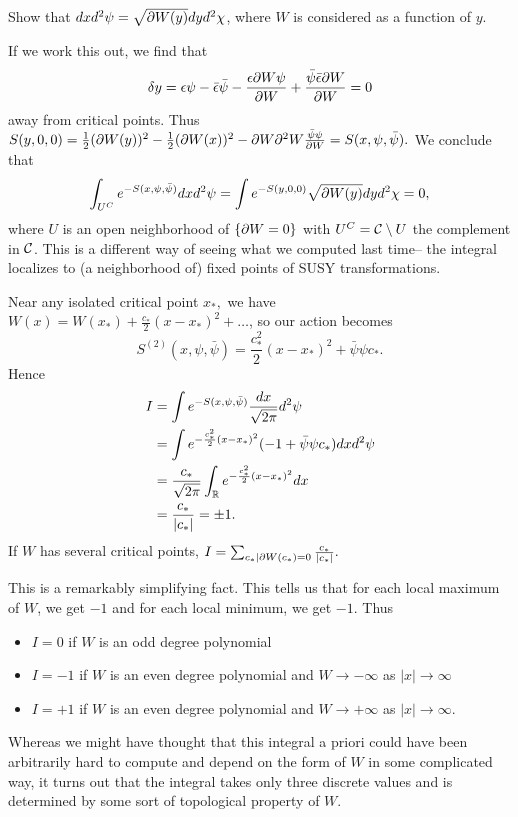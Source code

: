 \begin{ex}
    Show that $dx d^2\psi = \sqrt{\partial W(y)}dy d^2\chi$, where $W$ is considered as a function of $y$.
\end{ex}
If we work this out, we find that
\begin{equation}
    \delta y = \epsilon \psi -\bar \epsilon \bar \psi -\frac{\epsilon \partial W \psi}{\partial W}+\frac{\bar \psi \bar \epsilon \partial W}{\partial W}=0
\end{equation}%
away from critical points. Thus $S(y,0,0)=\frac{1}{2}(\partial W(y))^2- \frac{1}{2}(\partial W(x))^2 -\partial W \partial^2 W \frac{\bar \psi \psi}{\partial W}=S(x,\psi,\bar \psi).$
We conclude that
\begin{equation}
    \int_{U^C} e^{-S(x,\psi,\bar \psi)}dx d^2 \psi = \int e^{-S(y,0,0)}\sqrt{\partial W(y)}dy d^2 \chi =0,
\end{equation}
where $U$ is an open neighborhood of $\{\partial W =0\}$ with $U^C = \mathcal{C} \setminus U$ the complement in $\mathcal{C}$. This is a different way of seeing what we computed last time-- the integral localizes to (a neighborhood of) fixed points of SUSY transformations.

Near any isolated critical point $x_*,$ we have $W(x)=W(x_*)+\frac{c_*}{2}(x-x_*)^2+\ldots$, so our action becomes
\begin{equation}
    S^{(2)}(x,\psi,\bar \psi)=\frac{c_*^2}{2}(x-x_*)^2 + \bar \psi \psi c_*.
\end{equation}
Hence
\begin{align*}
    I &= \int e^{-S(x, \psi,\bar \psi)}\frac{dx}{\sqrt{2\pi}} d^2 \psi\\
    &= \int e^{-\frac{c_*^2}{2} (x-x_*)^2} (-1 +\bar \psi \psi c_*)dx d^2\psi\\
    &= \frac{c_*}{\sqrt{2\pi}}\int_{\mathbb{R}} e^{-\frac{c_*^2}{2}(x-x_*)^2} dx\\
    &= \frac{c_*}{\lvert c_*\rvert} = \pm 1.
\end{align*}
If $W$ has several critical points, $I=\sum_{c_*| \partial W(c_*)=0} \frac{c_*}{\lvert c_*\rvert}.$

This is a remarkably simplifying fact. This tells us that for each local maximum of $W$, we get $-1$ and for each local minimum, we get $-1$. Thus
\begin{itemize}
    \item $I=0$ if $W$ is an odd degree polynomial
    \item $I=-1$ if $W$ is an even degree polynomial and $W\to -\infty$ as $|x|\to \infty$
    \item $I=+1$ if $W$ is an even degree polynomial and $W\to +\infty$ as $|x|\to \infty$.
\end{itemize}
Whereas we might have thought that this integral a priori could have been arbitrarily hard to compute and depend on the form of $W$ in some complicated way, it turns out that the integral takes only three discrete values and is determined by some sort of topological property of $W$.

